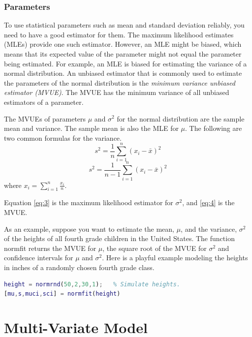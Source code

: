 \documentclass{article}
\begin{document}
\subsubsection{Parameters}
\label{sec:parameters}

To use statistical parameters such as mean and standard deviation
reliably, you need to have a good estimator for them. The maximum
likelihood estimates (MLEs) provide one such estimator. However, an
MLE might be biased, which means that its expected value of the
parameter might not equal the parameter being estimated. For example,
an MLE is biased for estimating the variance of a normal
distribution. An unbiased estimator that is commonly used to estimate
the parameters of the normal distribution is the \emph{minimum
  variance unbiased estimator (MVUE)}. The MVUE has the minimum
variance of all unbiased estimators of a parameter. 
\par
The MVUEs of parameters $\mu$ and $\sigma^{2}$ for the normal
distribution are the sample mean and variance. The sample mean is also
the MLE for $\mu$. The following are two common formulas for the
variance. 
\begin{equation}
  \label{eq:3}
  s^{2}=\frac{1}{n}\sum_{i=1}^{n}{(x_{i}-\bar{x})}^{2}
\end{equation}
\begin{equation}
  \label{eq:4}
  s^{2}=\frac{1}{n-1}\sum_{i=1}^{n}{(x_{i}-\bar{x})}^{2}  
\end{equation}
where $x_{i}=\sum_{i=1}^{n}\frac{x_{i}}{n}$.
\par
Equation \eqref{eq:3} is the maximum likelihood estimator for
$\sigma^{2}$, and \eqref{eq:4} is the MVUE\@.
\par
As an example, suppose you want to estimate the mean, $\mu$, and the
variance, $\sigma^{2}$ of the heights of all fourth grade children in
the United States. The function normfit returns the MVUE for $\mu$,
the square root of the MVUE for $\sigma^{2}$ and confidence intervals
for $\mu$ and $\sigma^{2}$. Here is a playful example modeling the
heights in inches of a randomly chosen fourth grade class. 
\begin{lstlisting}[language=Matlab]
height = normrnd(50,2,30,1);   % Simulate heights.
[mu,s,muci,sci] = normfit(height)
\end{lstlisting}


\section{Multi-Variate Model}
\label{sec:multi-variate-model}
\end{document}
